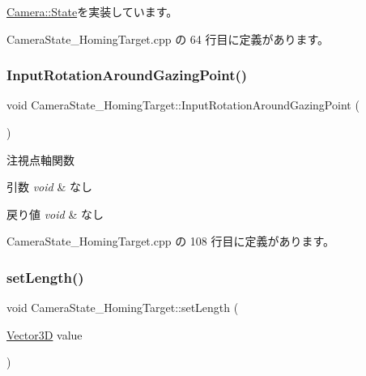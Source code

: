 \mbox{\hyperlink{class_camera_1_1_state_a11627f91e7dc5085d3cbb8841747a778}{Camera\+::\+State}}を実装しています。



 Camera\+State\+\_\+\+Homing\+Target.\+cpp の 64 行目に定義があります。

\mbox{\label{class_camera_state___homing_target_a131b0dc7ec8aee7521cf774fe975d314}} 
\subsubsection{\texorpdfstring{Input\+Rotation\+Around\+Gazing\+Point()}{InputRotationAroundGazingPoint()}}
{\footnotesize\ttfamily void Camera\+State\+\_\+\+Homing\+Target\+::\+Input\+Rotation\+Around\+Gazing\+Point (\begin{DoxyParamCaption}{ }\end{DoxyParamCaption})\hspace{0.3cm}{\ttfamily [private]}}



注視点軸関数 


\begin{DoxyParams}{引数}
{\em void} & なし \\
\hline
\end{DoxyParams}

\begin{DoxyRetVals}{戻り値}
{\em void} & なし \\
\hline
\end{DoxyRetVals}


 Camera\+State\+\_\+\+Homing\+Target.\+cpp の 108 行目に定義があります。

\mbox{\label{class_camera_state___homing_target_a6a67d7a1b2da38e6429fc301ce4c1ee1}} 
\subsubsection{\texorpdfstring{set\+Length()}{setLength()}}
{\footnotesize\ttfamily void Camera\+State\+\_\+\+Homing\+Target\+::set\+Length (\begin{DoxyParamCaption}\item[{\mbox{\hyperlink{class_vector3_d}{Vector3D}}}]{value }\end{DoxyParamCaption})}



